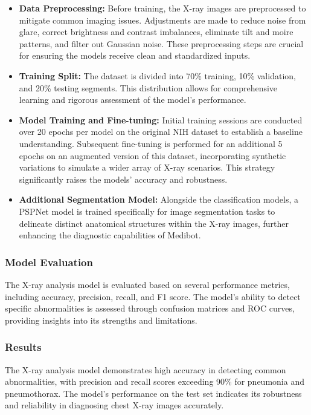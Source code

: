 \begin{itemize}
    \item \textbf{Data Preprocessing:} Before training, the X-ray images are preprocessed to mitigate common imaging issues. Adjustments are made to reduce noise from glare, correct brightness and contrast imbalances, eliminate tilt and moire patterns, and filter out Gaussian noise. These preprocessing steps are crucial for ensuring the models receive clean and standardized inputs.
    \item \textbf{Training Split:} The dataset is divided into 70\% training, 10\% validation, and 20\% testing segments. This distribution allows for comprehensive learning and rigorous assessment of the model's performance.
    \item \textbf{Model Training and Fine-tuning:} Initial training sessions are conducted over 20 epochs per model on the original NIH dataset to establish a baseline understanding. Subsequent fine-tuning is performed for an additional 5 epochs on an augmented version of this dataset, incorporating synthetic variations to simulate a wider array of X-ray scenarios. This strategy significantly raises the models' accuracy and robustness.
    \item \textbf{Additional Segmentation Model:} Alongside the classification models, a PSPNet model is trained specifically for image segmentation tasks to delineate distinct anatomical structures within the X-ray images, further enhancing the diagnostic capabilities of Medibot.
\end{itemize}

\subsubsection {Model Evaluation}

The X-ray analysis model is evaluated based on several performance metrics, including accuracy, precision, recall, and F1 score. The model's ability to detect specific abnormalities is assessed through confusion matrices and ROC curves, providing insights into its strengths and limitations.

\subsubsection {Results}

The X-ray analysis model demonstrates high accuracy in detecting common abnormalities, with precision and recall scores exceeding 90\% for pneumonia and pneumothorax. The model's performance on the test set indicates its robustness and reliability in diagnosing chest X-ray images accurately.


